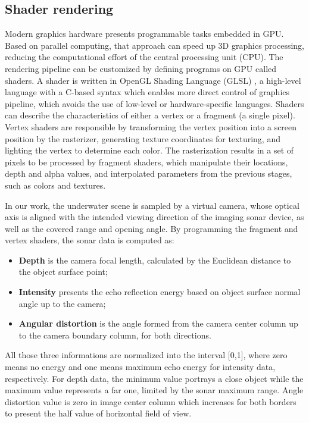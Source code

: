 \documentclass[final,5p,times]{elsarticle}
\begin{document}

\subsection{Shader rendering}
\label{dev:shader}

Modern graphics hardware presents programmable tasks embedded in GPU. Based
on parallel computing, that approach can speed up 3D graphics processing,
reducing the computational effort of the central processing unit (CPU). The
rendering pipeline can be customized by defining programs on GPU called
shaders. A shader is written in OpenGL Shading Language (GLSL) \cite{rost2009},
a high-level language with a C-based syntax which enables more direct control
of graphics pipeline, which avoids the use of low-level or hardware-specific
languages. Shaders can describe the characteristics of either a vertex or a
fragment (a single pixel). Vertex shaders are responsible by transforming the
vertex position into a screen position by the rasterizer, generating texture
coordinates for texturing, and lighting the vertex to determine each color.
The rasterization results in a set of pixels to be processed by fragment
shaders, which manipulate their locations, depth and alpha values, and
interpolated parameters from the previous stages, such as colors and textures.

In our work, the underwater scene is sampled by a virtual camera, whose
optical axis is aligned with the intended viewing direction of the
imaging sonar device, as well as the covered range and opening angle.
By programming the fragment and vertex shaders, the sonar data is
computed as:

\begin{itemize}[(a)]
    \item \textbf{Depth} is the camera focal length, calculated by the
    Euclidean distance to the object surface point;
    \item \textbf{Intensity} presents the echo reflection energy based
    on object surface normal angle up to the camera;
    \item \textbf{Angular distortion} is the angle formed from the camera
    center column up to the camera boundary column, for both directions.
\end{itemize}

All those three informations are normalized into the interval [0,1],
where zero means no energy and one means maximum echo energy for
intensity data, respectively. For depth data, the minimum value portrays
a close object while the maximum value represents a far one, limited by
the sonar maximum range. Angle distortion value is zero in image center
column which increases for both borders to present the half value
of horizontal field of view.
\end{document}
